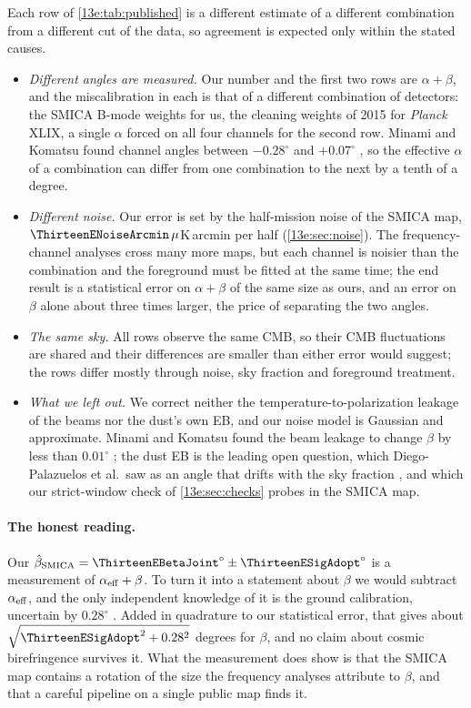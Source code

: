 Each row of \cref{13e:tab:published} is a different estimate of a different combination from a different
cut of the data, so agreement is expected only within the stated causes.
\begin{itemize}[itemsep=2pt,leftmargin=1.2em]
  \item \emph{Different angles are measured.} Our number and the first two rows are $\alpha+\beta$, and the
        miscalibration in each is that of a different combination of detectors: the SMICA B-mode weights for
        us, the cleaning weights of 2015 for \textit{Planck} XLIX, a single $\alpha$ forced on all four channels
        for the second row. Minami and Komatsu found channel angles between $-0.28^\circ$ and $+0.07^\circ$
        \cite[Table~I]{MinamiKomatsu2020}, so the effective $\alpha$ of a combination can differ from one
        combination to the next by a tenth of a degree.
  \item \emph{Different noise.} Our error is set by the half-mission noise of the SMICA map,
        $\ThirteenENoiseArcmin\,\mu$K\,arcmin per half (\cref{13e:sec:noise}). The frequency-channel analyses
        cross many more maps, but each channel is noisier than the combination and the foreground must be
        fitted at the same time; the end result is a statistical error on $\alpha+\beta$ of the same size as ours,
        and an error on $\beta$ alone about three times larger, the price of separating the two angles.
  \item \emph{The same sky.} All rows observe the same CMB, so their CMB fluctuations are shared and their
        differences are smaller than either error would suggest; the rows differ mostly through noise,
        sky fraction and foreground treatment.
  \item \emph{What we left out.} We correct neither the temperature-to-polarization leakage of the beams nor
        the dust's own EB, and our noise model is Gaussian and approximate. Minami and Komatsu found the beam
        leakage to change $\beta$ by less than $0.01^\circ$ \cite{MinamiKomatsu2020}; the dust EB is the
        leading open question, which Diego-Palazuelos et al.\ saw as an angle that drifts with the sky fraction
        \cite{DiegoPalazuelos2022}, and which our strict-window check of \cref{13e:sec:checks} probes in the
        SMICA map.
\end{itemize}

\paragraph{The honest reading.} Our $\hat\beta_{\rm SMICA}=\ThirteenEBetaJoint^\circ\pm\ThirteenESigAdopt^\circ$ is a
measurement of $\alpha_{\rm eff}+\beta$. To turn it into a statement about $\beta$ we would subtract $\alpha_{\rm eff}$, and
the only independent knowledge of it is the ground calibration, uncertain by $0.28^\circ$
\cite{PlanckIntXLIX2016}. Added in quadrature to our statistical error, that gives about
$\sqrt{\ThirteenESigAdopt^2+0.28^2}$ degrees for $\beta$, and no claim about cosmic birefringence survives it. What
the measurement does show is that the SMICA map contains a rotation of the size the frequency analyses
attribute to $\beta$, and that a careful pipeline on a single public map finds it.


